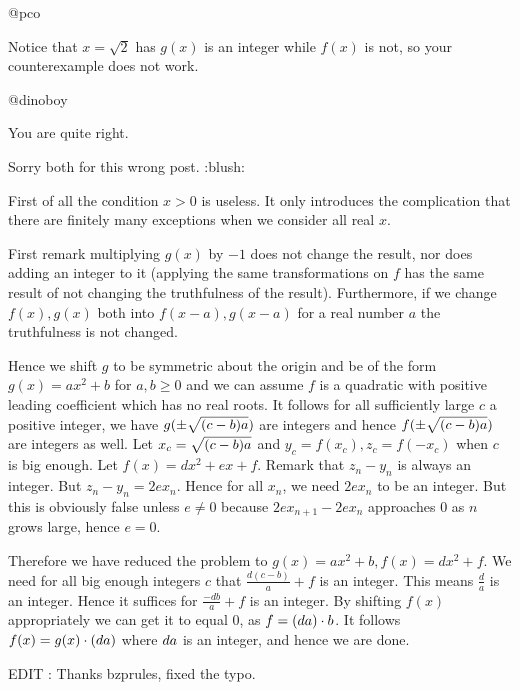 \begin{solution}
	@pco

Notice that $x = \sqrt{2}$ has $g(x)$ is an integer while $f(x)$ is not, so your counterexample does not work.
\end{solution}



\begin{solution}
	@dinoboy

You are quite right.

Sorry both for this wrong post.  :blush:
\end{solution}



\begin{solution}
	First of all the condition $x > 0$ is useless.  It only introduces the complication that there are finitely many exceptions when we consider all real $x$.

First remark multiplying $g(x)$ by $-1$ does not change the result, nor does adding an integer to it (applying the same transformations on $f$ has the same result of not changing the truthfulness of the result). Furthermore, if we change $f(x), g(x)$ both into $f(x-a), g(x-a)$ for a real number $a$ the truthfulness is not changed.

Hence we shift $g$ to be symmetric about the origin and be of the form $g(x) = ax^2 + b$ for $a,b \ge 0$ and we can assume $f$ is a quadratic with positive leading coefficient which has no real roots. It follows for all sufficiently large $c$ a positive integer, we have $g(\pm \sqrt{(c-b)\/a})$ are integers and hence $f(\pm \sqrt{(c-b)\/a})$ are integers as well. Let $x_c = \sqrt{(c-b)\/a}$ and $y_c = f(x_c), z_c = f(-x_c)$ when $c$ is big enough. Let $f(x) = dx^2 + ex + f$. Remark that $z_n - y_n$ is always an integer.
But $z_n - y_n = 2ex_n$. Hence for all $x_n$, we need $2ex_n$ to be an integer. But this is obviously false unless $e \neq 0$ because $2ex_{n+1} - 2ex_n$ approaches $0$ as $n$ grows large, hence $e=0$.

Therefore we have reduced the problem to $g(x) = ax^2 + b, f(x) = dx^2 + f$. We need for all big enough integers $c$ that $\frac{d(c-b)}{a} + f$ is an integer. This means $\frac{d}{a}$ is an integer. Hence it suffices for $\frac{-db}{a} + f$ is an integer. By shifting $f(x)$ appropriately we can get it to equal $0$, as $f = (d\/a) \cdot b$. It follows $f(x) = g(x) \cdot (d\/a)$ where $d\/a$ is an integer, and hence we are done.

EDIT : Thanks bzprules, fixed the typo.
\end{solution}



